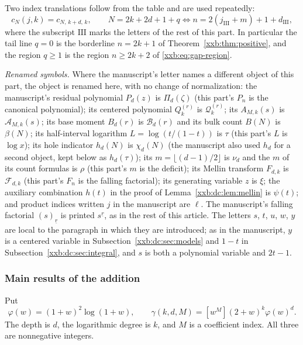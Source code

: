 \documentclass[11pt,a4paper]{article}
\numberwithin{equation}{section}
\theoremstyle{definition}
\theoremstyle{remark}
\theoremstyle{plain}
\newcommand{\fall}[2]{#1^{\underline{#2}}}
\begin{document}
Two index translations follow from the table and are used repeatedly:
\[
 c_N(j,k)=c_{N,\,k+d,\,k},\qquad
 N=2k+2d+1+q\iff n=2(j_{\mathrm{III}}+m)+1+d_{\mathrm{III}},
\]
where the subscript $\mathrm{III}$ marks the letters of the rest of this part.
In particular the tail line $q=0$ is the borderline $n=2k+1$ of
Theorem~\ref{xxb:thm:positive}, and the region $q\ge1$ is the region
$n\ge2k+2$ of \eqref{xxb:eq:gap-region}.

\emph{Renamed symbols.}  Where the manuscript's letter names a different object
of this part, the object is renamed here, with no change of normalization:
the manuscript's residual polynomial $P_d(z)$ is $\Pi_d(\zeta)$ (this part's
$P_n$ is the canonical polynomial); its centered polynomial $Q_k^{(r)}$ is
$\mathcal Q_k^{(r)}$; its $A_{M,k}(s)$ is $\mathcal A_{M,k}(s)$; its base moment
$B_d(r)$ is $\mathcal B_d(r)$ and its bulk count $B(N)$ is $\beta(N)$; its
half-interval logarithm $L=\log(t/(1-t))$ is $\tau$ (this part's $L$ is
$\log x$); its hole indicator $h_d(N)$ is $\chi_d(N)$ (the manuscript also used
$h_d$ for a second object, kept below as $h_d(\tau)$); its
$m=\lfloor(d-1)/2\rfloor$ is $\nu_d$ and the $m$ of its count formulas is
$\rho$ (this part's $m$ is the deficit); its Mellin transform $F_{d,k}$ is
$\mathcal F_{d,k}$ (this part's $F_n$ is the falling factorial); its generating
variable $z$ is $\xi$; the auxiliary combination $h(t)$ in the proof of
Lemma~\ref{xxb:dc:lem:mellin} is $\psi(t)$; and product indices written $j$ in
the manuscript are $\ell$.  The manuscript's falling factorial
$(s)_{\underline r}$ is printed $\fall{s}{r}$, as in the rest of this article.
The letters $s$, $t$, $u$, $w$, $y$ are local to the paragraph in which they
are introduced; as in the manuscript, $y$ is a centered variable in
Subsection~\ref{xxb:dc:sec:models} and $1-t$ in
Subsection~\ref{xxb:dc:sec:integral}, and $s$ is both a polynomial variable and
$2t-1$.

\subsubsection{Main results of the addition}

Put
\begin{equation}\label{xxb:dc:eq:gamma}
 \varphi(w)=(1+w)^2\log(1+w),\qquad
 \gamma(k,d,M)=[w^M](2+w)^k\varphi(w)^d.
\end{equation}
The depth is $d$, the logarithmic degree is $k$, and $M$ is a coefficient
index.  All three are nonnegative integers.
\end{document}
